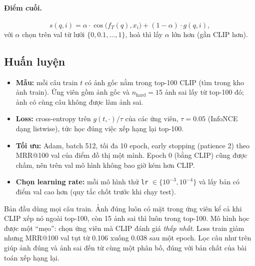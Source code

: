\documentclass[12pt, a4paper]{article}
\makeatletter
\newenvironment{ghichu}[1][Ghi chú]{%
  \begin{tcolorbox}[madridblock, colback=madrid!6, colframe=madrid, title={#1}]
}{\end{tcolorbox}}
\newcommand{\code}[1]{\texttt{#1}}
\newcommand{\mrr}{MRR@100}
\makeatother
\begin{document}
\paragraph{Điểm cuối.}
\begin{equation}
s(q,i) = \alpha\cdot\cos\big(f_T(q),x_i\big) + (1-\alpha)\cdot g(q,i),
\end{equation}
với $\alpha$ chọn trên val từ lưới $\{0, 0.1, \dots, 1\}$, hoà thì lấy $\alpha$ lớn hơn (gần CLIP hơn).

\subsection{Huấn luyện}
\begin{itemize}
\item \textbf{Mẫu:} mỗi câu train $t$ có ảnh gốc nằm trong top-100 CLIP (tìm trong kho ảnh train). Ứng viên gồm ảnh gốc và $n_{\text{hard}}=15$ ảnh sai lấy từ top-100 đó; ảnh có cùng câu không được làm ảnh sai.
\item \textbf{Loss:} cross-entropy trên $g(t,\cdot)/\tau$ của các ứng viên, $\tau=0.05$ (InfoNCE~\cite{oord2018cpc} dạng listwise), tức học đúng việc xếp hạng lại top-100.
\item \textbf{Tối ưu:} Adam, batch 512, tối đa 10 epoch, early stopping (patience 2) theo \mrr{} val của điểm đồ thị một mình. Epoch 0 (bằng CLIP) cũng được chấm, nên trên val mô hình không bao giờ kém hơn CLIP.
\item \textbf{Chọn learning rate:} mỗi mô hình thử \code{lr} $\in\{10^{-3}, 10^{-4}\}$ và lấy bản có điểm val cao hơn (quy tắc chốt trước khi chạy test).
\end{itemize}

\begin{ghichu}[Một lỗi đã gặp và cách sửa (ADR-0047)]
Bản đầu dùng mọi câu train. Ảnh đúng luôn có mặt trong ứng viên kể cả khi CLIP xếp nó ngoài top-100, còn 15 ảnh sai thì luôn trong top-100. Mô hình học được một ``mẹo'': chọn ứng viên mà CLIP đánh giá \emph{thấp nhất}. Loss train giảm nhưng \mrr{} val tụt từ 0.106 xuống 0.038 sau một epoch. Lọc câu như trên giúp ảnh đúng và ảnh sai đến từ cùng một phân bố, đúng với bản chất của bài toán xếp hạng lại.
\end{ghichu}
\end{document}
